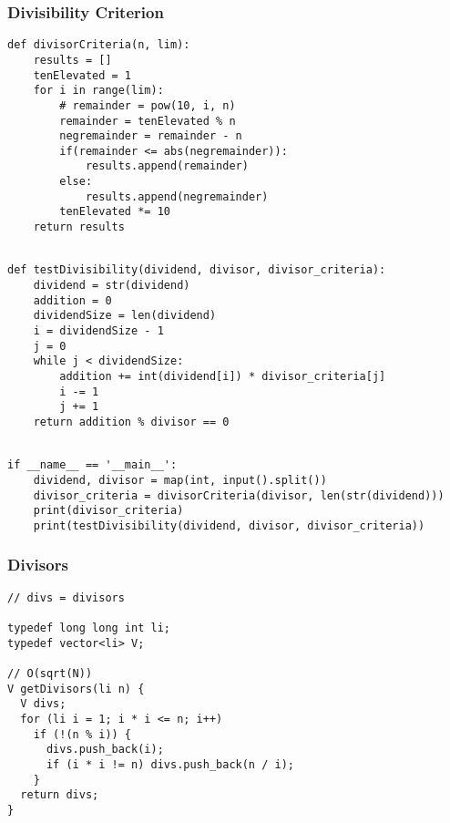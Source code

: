 \documentclass[twoside]{article}
\begin{document}
\begin{multicols*}{2}
\subsubsectionfont{\large\bfseries\sffamily\underline}
\subsubsection*{Divisibility Criterion}
\begin{verbatim}
def divisorCriteria(n, lim):
    results = []
    tenElevated = 1
    for i in range(lim):
        # remainder = pow(10, i, n)
        remainder = tenElevated % n
        negremainder = remainder - n
        if(remainder <= abs(negremainder)):
            results.append(remainder)
        else:
            results.append(negremainder)
        tenElevated *= 10
    return results


\end{verbatim}
\vspace{-12pt}
\begin{verbatim}
def testDivisibility(dividend, divisor, divisor_criteria):
    dividend = str(dividend)
    addition = 0
    dividendSize = len(dividend)
    i = dividendSize - 1
    j = 0
    while j < dividendSize:
        addition += int(dividend[i]) * divisor_criteria[j]
        i -= 1
        j += 1
    return addition % divisor == 0


\end{verbatim}
\vspace{-12pt}
\begin{verbatim}
if __name__ == '__main__':
    dividend, divisor = map(int, input().split())
    divisor_criteria = divisorCriteria(divisor, len(str(dividend)))
    print(divisor_criteria)
    print(testDivisibility(dividend, divisor, divisor_criteria))

\end{verbatim}

\subsubsectionfont{\large\bfseries\sffamily\underline}
\subsubsection*{Divisors}
\begin{verbatim}
// divs = divisors

typedef long long int li;
typedef vector<li> V;

// O(sqrt(N))
V getDivisors(li n) {
  V divs;
  for (li i = 1; i * i <= n; i++)
    if (!(n % i)) {
      divs.push_back(i);
      if (i * i != n) divs.push_back(n / i);
    }
  return divs;
}
\end{verbatim}


\end{multicols*}
\end{document}
